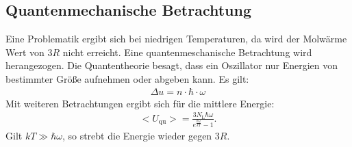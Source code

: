\subsection{Quantenmechanische Betrachtung}
Eine Problematik ergibt sich bei niedrigen Temperaturen, da wird der Molwärme Wert
von $3R$ nicht erreicht. Eine quantenmeschanische Betrachtung wird herangezogen.
Die Quantentheorie besagt, dass ein Oszillator nur Energien von bestimmter Größe
aufnehmen oder abgeben kann.
Es gilt:
\begin{align}
  \Delta u=n\cdot\hbar\cdot\omega
\end{align}
Mit weiteren Betrachtungen ergibt sich für die mittlere Energie:
\begin{align}
\bigl<U_{\mathrm{qu}}\bigr>=\frac{3N_{\mathrm{L}}\hbar\omega}{e^{\frac{\hbar\omega}{kT}}-1}.
\end{align}
Gilt $kT \gg \hbar\omega$, so strebt die Energie wieder gegen $3R$.
